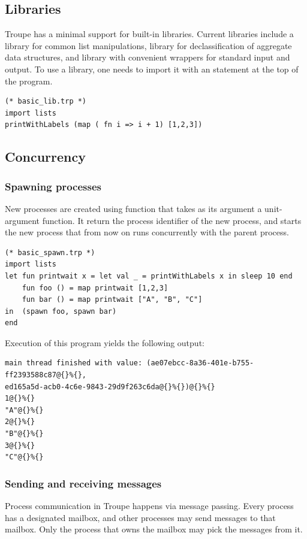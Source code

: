 \subsection{Libraries}
\label{sec:labels}
Troupe has a minimal support for built-in libraries. Current libraries include a library  for common list manipulations, library  for declassification of aggregate data structures, and library
 with convenient wrappers for standard input and output. To use a library, one needs to import it with an  statement at the top of the program.
\begin{lstlisting}
(* basic_lib.trp *)
import lists
printWithLabels (map ( fn i => i + 1) [1,2,3])
\end{lstlisting}


\subsection{Concurrency}
\label{sec:concurrency}
\subsubsection{Spawning processes}
New processes are created using  function that takes as its argument a unit-argument function.
It return the process identifier of the new process, and starts the new process that from now on runs concurrently with the
parent process.
\begin{lstlisting}
(* basic_spawn.trp *)
import lists
let fun printwait x = let val _ = printWithLabels x in sleep 10 end
    fun foo () = map printwait [1,2,3]
    fun bar () = map printwait ["A", "B", "C"]
in  (spawn foo, spawn bar)
end
\end{lstlisting}
Execution of this program yields the following output:
\begin{verbatim}
main thread finished with value: (ae07ebcc-8a36-401e-b755-ff2393588c87@{}%{},
ed165a5d-acb0-4c6e-9843-29d9f263c6da@{}%{})@{}%{}
1@{}%{}
"A"@{}%{}
2@{}%{}
"B"@{}%{}
3@{}%{}
"C"@{}%{}
\end{verbatim}


\subsubsection{Sending and receiving messages}
Process communication in Troupe happens via message passing.  Every process has a designated mailbox,
and other processes may send messages to that mailbox. Only the process that owns the mailbox may pick the messages from it.

